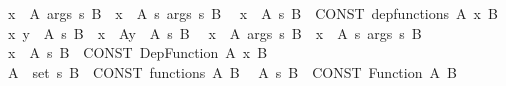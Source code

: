 \begin{isabellebody}
\ \ {\isachardoublequoteopen}{\isacharparenleft}{\kern0pt}x\ {\isasymin}\ A{\isacharparenright}{\kern0pt}\ args\ {\isasymrightarrow}s\ B{\isachardoublequoteclose}\ {\isasymrightharpoonup}\ {\isachardoublequoteopen}{\isacharparenleft}{\kern0pt}x\ {\isasymin}\ A{\isacharparenright}{\kern0pt}\ {\isasymrightarrow}s\ args\ {\isasymrightarrow}s\ B{\isachardoublequoteclose}\isanewline
\ \ {\isachardoublequoteopen}{\isacharparenleft}{\kern0pt}x\ {\isasymin}\ A{\isacharparenright}{\kern0pt}\ {\isasymrightarrow}s\ B{\isachardoublequoteclose}\ {\isasymrightleftharpoons}\ {\isachardoublequoteopen}CONST\ dep{\isacharunderscore}{\kern0pt}functions\ A\ {\isacharparenleft}{\kern0pt}{\isasymlambda}x{\isachardot}{\kern0pt}\ B{\isacharparenright}{\kern0pt}{\isachardoublequoteclose}\isanewline
\isanewline
\ \ {\isachardoublequoteopen}{\isacharparenleft}{\kern0pt}x\ y\ {\isacharcolon}{\kern0pt}\ A{\isacharparenright}{\kern0pt}\ {\isasymrightarrow}s\ B{\isachardoublequoteclose}\ {\isasymrightharpoonup}\ {\isachardoublequoteopen}{\isacharparenleft}{\kern0pt}x\ {\isacharcolon}{\kern0pt}\ A{\isacharparenright}{\kern0pt}{\isacharparenleft}{\kern0pt}y\ {\isacharcolon}{\kern0pt}\ A{\isacharparenright}{\kern0pt}\ {\isasymrightarrow}s\ B{\isachardoublequoteclose}\isanewline
\ \ {\isachardoublequoteopen}{\isacharparenleft}{\kern0pt}x\ {\isacharcolon}{\kern0pt}\ A{\isacharparenright}{\kern0pt}\ args\ {\isasymrightarrow}s\ B{\isachardoublequoteclose}\ {\isasymrightharpoonup}\ {\isachardoublequoteopen}{\isacharparenleft}{\kern0pt}x\ {\isacharcolon}{\kern0pt}\ A{\isacharparenright}{\kern0pt}\ {\isasymrightarrow}s\ args\ {\isasymrightarrow}s\ B{\isachardoublequoteclose}\isanewline
\ \ {\isachardoublequoteopen}{\isacharparenleft}{\kern0pt}x\ {\isacharcolon}{\kern0pt}\ A{\isacharparenright}{\kern0pt}\ {\isasymrightarrow}s\ B{\isachardoublequoteclose}\ {\isasymrightleftharpoons}\ {\isachardoublequoteopen}CONST\ Dep{\isacharunderscore}{\kern0pt}Function\ A\ {\isacharparenleft}{\kern0pt}{\isasymlambda}x{\isachardot}{\kern0pt}\ B{\isacharparenright}{\kern0pt}{\isachardoublequoteclose}\isanewline
\ \ \isanewline
\ \ {\isachardoublequoteopen}{\isacharparenleft}{\kern0pt}A\ {\isacharcolon}{\kern0pt}{\isacharcolon}{\kern0pt}\ set{\isacharparenright}{\kern0pt}\ {\isasymrightarrow}s\ B{\isachardoublequoteclose}\ {\isasymrightleftharpoons}\ {\isachardoublequoteopen}CONST\ functions\ A\ B{\isachardoublequoteclose}\isanewline
\ \ {\isachardoublequoteopen}A\ {\isasymrightarrow}s\ B{\isachardoublequoteclose}\ {\isasymrightleftharpoons}\ {\isachardoublequoteopen}CONST\ Function\ A\ B{\isachardoublequoteclose}\isanewline

\end{isabellebody}
